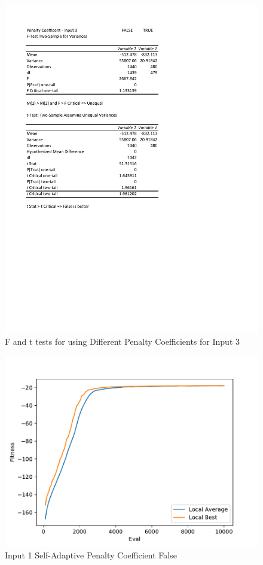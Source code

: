 \documentclass[times]{article}
\begin{document}
	\begin{figure}
		\caption{F and t tests for using Different Penalty Coefficients for Input 3}
		\label{fig:coeff3}
		\includegraphics[width=\textwidth]{./t_test/S-APenaltyCoeff3}
	\end{figure}

	\begin{figure}
		\caption{Input 1 Self-Adaptive Penalty Coefficient False}
		\label{fig:coeff1False}
		\includegraphics[width=\textwidth]{../graphs/graphs/1068}
	\end{figure}
\end{document}
